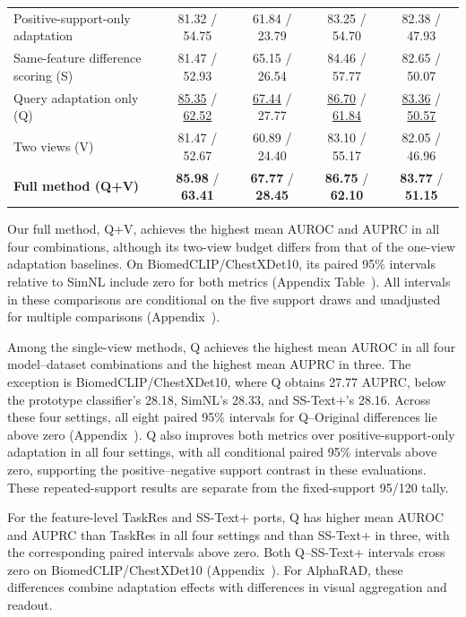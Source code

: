 \documentclass[10pt,twocolumn,letterpaper]{article}
\begin{document}
\begin{table}[t]
\begin{tabular*}{\textwidth}{@{\extracolsep{\fill}}lcccc}
Positive-support-only adaptation & 81.32 / 54.75 & 61.84 / 23.79 & 83.25 / 54.70 & 82.38 / 47.93 \\
Same-feature difference scoring (S) & 81.47 / 52.93 & 65.15 / 26.54 & 84.46 / 57.77 & 82.65 / 50.07 \\
Query adaptation only (Q) & \underline{85.35} / \underline{62.52} & \underline{67.44} / 27.77 & \underline{86.70} / \underline{61.84} & \underline{83.36} / \underline{50.57} \\
Two views (V) & 81.47 / 52.67 & 60.89 / 24.40 & 83.10 / 55.17 & 82.05 / 46.96 \\
\textbf{Full method (Q+V)} & \textbf{85.98} / \textbf{63.41} & \textbf{67.77} / \textbf{28.45} & \textbf{86.75} / \textbf{62.10} & \textbf{83.77} / \textbf{51.15} \\
\bottomrule
\end{tabular*}
\end{table}

Our full method, Q+V, achieves the highest mean AUROC and AUPRC in all four combinations, although its two-view budget differs from that of the one-view adaptation baselines. On BiomedCLIP/ChestXDet10, its paired 95\% intervals relative to SimNL include zero for both metrics (Appendix Table~). All intervals in these comparisons are conditional on the five support draws and unadjusted for multiple comparisons (Appendix~).

Among the single-view methods, Q achieves the highest mean AUROC in all four model--dataset combinations and the highest mean AUPRC in three. The exception is BiomedCLIP/ChestXDet10, where Q obtains 27.77 AUPRC, below the prototype classifier's 28.18, SimNL's 28.33, and SS-Text+'s 28.16. Across these four settings, all eight paired 95\% intervals for Q--Original differences lie above zero (Appendix~). Q also improves both metrics over positive-support-only adaptation in all four settings, with all conditional paired 95\% intervals above zero, supporting the positive--negative support contrast in these evaluations. These repeated-support results are separate from the fixed-support 95/120 tally.

For the feature-level TaskRes and SS-Text+ ports, Q has higher mean AUROC and AUPRC than TaskRes in all four settings and than SS-Text+ in three, with the corresponding paired intervals above zero. Both Q--SS-Text+ intervals cross zero on BiomedCLIP/ChestXDet10 (Appendix~). For AlphaRAD, these differences combine adaptation effects with differences in visual aggregation and readout.
\end{document}
